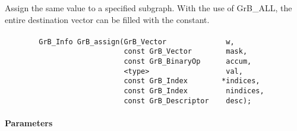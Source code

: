 Assign the same value to a specified subgraph.  With the use of {\sf GrB\_ALL}, the 
entire destination vector can be filled with the constant.

\paragraph{\syntax}

\begin{verbatim}
        GrB_Info GrB_assign(GrB_Vector              w,
                            const GrB_Vector        mask,
                            const GrB_BinaryOp      accum,
                            <type>                  val,
                            const GrB_Index        *indices,
                            const GrB_Index         nindices,
                            const GrB_Descriptor    desc);
\end{verbatim}

\paragraph{Parameters}

